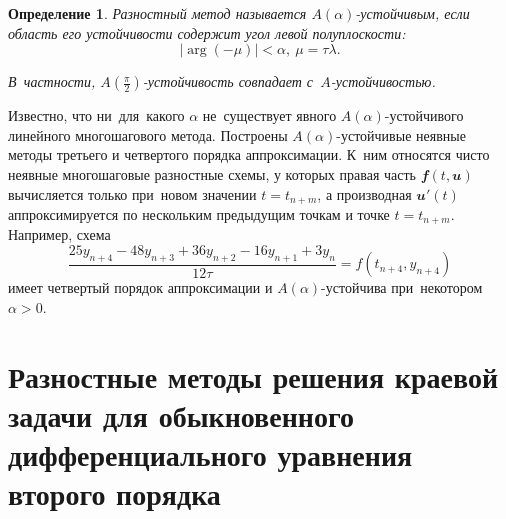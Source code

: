 \documentclass[11pt,a4paper,twoside,listtotoc,bibtotoc]{report}
\numberwithin{equation}{section}
\newtheorem*{definition}{Определение}
\theoremstyle{definition}
\theoremstyle{plain}
\newcommand{\vfunc}[1]{\mathbfit{#1}}
\begin{document}
\begin{definition}
    Разностный метод называется $A(\alpha)$-устойчивым, если область его
    устойчивости содержит угол левой полуплоскости:
    $$
        |\operatorname{arg}(-\mu)|<\alpha,~\mu=\tau\lambda.
    $$
    \begin{figure}[H]
        \centering
    \end{figure}

    В~частности, $A\left(\frac{\pi}{2}\right)$-устойчивость совпадает с~$A$-устойчивостью.
\end{definition}





Известно, что ни~для~какого $\alpha$ не~существует явного
$A(\alpha)$-устойчивого линейного многошагового метода. Построены
$A(\alpha)$-устойчивые неявные методы третьего и четвертого порядка аппроксимации.
К~ним относятся чисто неявные многошаговые разностные схемы, у которых правая часть
$\vfunc{f}(t, \vfunc{u})$ вычисляется только при~новом значении $t=t_{n+m}$, а
производная $\vfunc{u}'(t)$ аппроксимируется по нескольким предыдущим точкам и точке
$t=t_{n+m}$. Например, схема
%
$$
    \frac{25y_{n+4}-48y_{n+3}+36y_{n+2}-16y_{n+1}+3y_n}{12\tau}=f(t_{n+4},y_{n+4})
$$
%
имеет четвертый порядок аппроксимации и $A(\alpha)$-устойчива при~некотором
$\alpha > 0$.

%
\section[Разностные методы решения краевой задачи для ОДУ второго порядка]
{Разностные методы решения краевой задачи для обыкновенного дифференциального
уравнения второго порядка}
%
%
\end{document}
